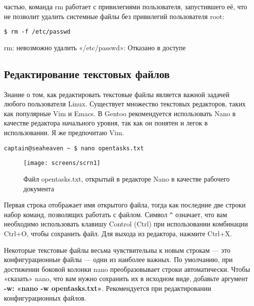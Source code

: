 \documentclass[12pt]{book}
\begin{document}
частью, команда rm работает с привилегиями пользователя, запустившего её, что не позволит удалить системные файлы без привилегий пользователя root:

\vspace{3mm}
\begin{tcolorbox}
\begin{lstlisting}
$ rm -f /etc/passwd
\end{lstlisting}
rm: невозможно удалить «/etc/passwd»: Отказано в доступе
\end{tcolorbox}

\vspace{-4mm}
\subsection{Редактирование текстовых файлов }

Знание о том, как редактировать текстовые файлы является важной задачей любого пользователя Linux. Существует множество текстовых редакторов, таких как популярные Vim и Emacs. В Gentoo рекомендуется использовать Nano  в качестве редактора начального уровня, так как он понятен и легок в использовании. Я же предпочитаю Vim.

\vspace{3mm}
\begin{tcolorbox}
\begin{lstlisting}
captain@seaheaven ~ $ nano opentasks.txt
\end{lstlisting}
\end{tcolorbox}

\begin{figure}[!ht]
\centering
\texttt{[image: screens/scrn1]}
\caption{Файл opentasks.txt, открытый в редакторе Nano в качестве рабочего документа}
\end{figure}

Первая строка отображает имя открытого файла, тогда как последние две строки набор команд, позволящих работать с файлом. Символ \verb|^| означает, что вам необходимо использовать клавишу Control (Ctrl) при использовании комбинации Ctrl+O, чтобы сохранить файл. Для выхода из редактора, нажмите Ctrl+X.

Некоторые текстовые файлы весьма чувствительны к новым строкам — это конфигурационные файлы — одни из наиболее важных. По умолчанию, при достижении боковой колонки nano преобразовывает строки автоматически. Чтобы «сказать» nano, что вам нужно сохранить их в исходном виде, добавьте аргумент \textbf{-w: «nano -w opentasks.txt»}. Рекомендуется при редактировании конфигурационных файлов.
\end{document}
